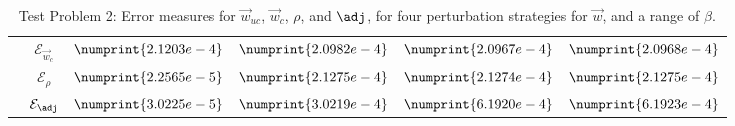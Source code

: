 \begin{table}
\begin{tabular}{ | c | c || c | c | c | c ||}
 & $\mathcal{E}_{\vec{w}_c}$ & $\numprint{2.1203e-4}$ & $\numprint{2.0982e-4}$ & $\numprint{2.0967e-4}$ & $\numprint{2.0968e-4}$ \\
 & $\mathcal{E}_{\rho}$ & $\numprint{2.2565e-5}$ & $\numprint{2.1275e-4}$ & $\numprint{2.1274e-4}$ & $\numprint{2.1275e-4}$ \\
 & $\mathcal{E}_{\adj}$ & $\numprint{3.0225e-5}$ & $\numprint{3.0219e-4}$ & $\numprint{6.1920e-4}$ & $\numprint{6.1923e-4}$ \\
\hline
\end{tabular}
\caption{Test Problem 2: Error measures for $\vec{w}_{uc}$, $\vec{w}_{c}$, $\rho$, and $\adj$, for four perturbation strategies for $\vec{w}$, and a range of $\beta$.}
\label{TabA2:Prob1}
\end{table}